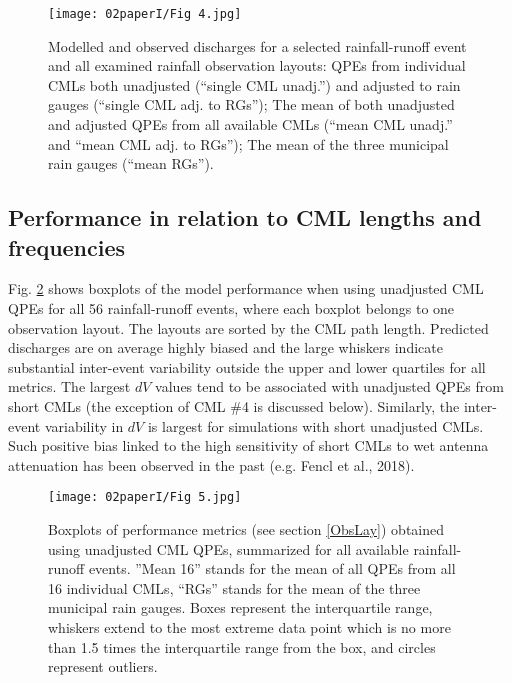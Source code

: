 \documentclass{ctuthesis}\usepackage[]{graphicx}\usepackage[]{color}
\begin{document}
\begin{figure}[H]
\begin{center}
\texttt{[image: 02paperI/Fig 4.jpg]}
\caption{Modelled and observed discharges for a selected rainfall-runoff event and all examined rainfall observation layouts: QPEs from individual CMLs both unadjusted (“single CML unadj.”) and adjusted to rain gauges (“single CML adj. to RGs”); The mean of both unadjusted and adjusted QPEs from all available CMLs (“mean CML unadj.” and “mean CML adj. to RGs”); The mean of the three municipal rain gauges (“mean RGs”).} \label{2fig4}
\end{center}
\end{figure}

\subsection{Performance in relation to CML lengths and frequencies}

Fig. \ref{2fig5} shows boxplots of the model performance when using unadjusted CML QPEs for all 56 rainfall-runoff events, where each boxplot belongs to one observation layout. The layouts are sorted by the CML path length. Predicted discharges are on average highly biased and the large whiskers indicate substantial inter-event variability outside the upper and lower quartiles for all metrics. The largest $dV$ values tend to be associated with unadjusted QPEs from short CMLs (the exception of CML \#4 is discussed below). Similarly, the inter-event variability in $dV$ is largest for simulations with short unadjusted CMLs. Such positive bias linked to the high sensitivity of short CMLs to wet antenna attenuation has been observed in the past (e.g. Fencl et al., 2018).

\begin{figure}[H]
\begin{center}
\texttt{[image: 02paperI/Fig 5.jpg]}
\caption{Boxplots of performance metrics (see section \ref{ObsLay}) obtained using unadjusted CML QPEs, summarized for all available rainfall-runoff events. ”Mean 16” stands for the mean of all QPEs from all 16 individual CMLs, “RGs” stands for the mean of the three municipal rain gauges. Boxes represent the interquartile range, whiskers extend to the most extreme data point which is no more than 1.5 times the interquartile range from the box, and circles represent outliers.} \label{2fig5}
\end{center}
\end{figure}
\end{document}
